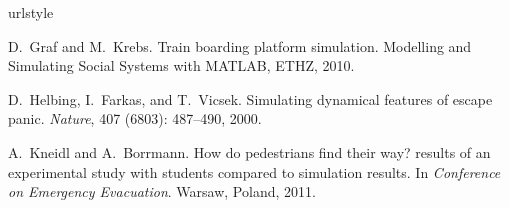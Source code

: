 \documentclass[11pt]{article}
\begin{document}
\begin{thebibliography}{3}
\providecommand{\natexlab}[1]{#1}
\providecommand{\url}[1]{\texttt{#1}}
\expandafter\ifx\csname urlstyle\endcsname\relax
  \providecommand{\doi}[1]{doi: #1}\else
  \providecommand{\doi}{doi: \begingroup \urlstyle{rm}\Url}\fi

D.~Graf and M.~Krebs.
\newblock Train boarding platform simulation.
\newblock Modelling and Simulating Social Systems with MATLAB, ETHZ, 2010.

D.~Helbing, I.~Farkas, and T.~Vicsek.
\newblock Simulating dynamical features of escape panic.
\newblock \emph{Nature}, 407 (6803): 487--490, 2000.

A.~Kneidl and A.~Borrmann.
\newblock How do pedestrians find their way? results of an experimental study
  with students compared to simulation results.
\newblock In \emph{Conference on Emergency Evacuation}. Warsaw, Poland, 2011.

\end{thebibliography}
\end{document}
